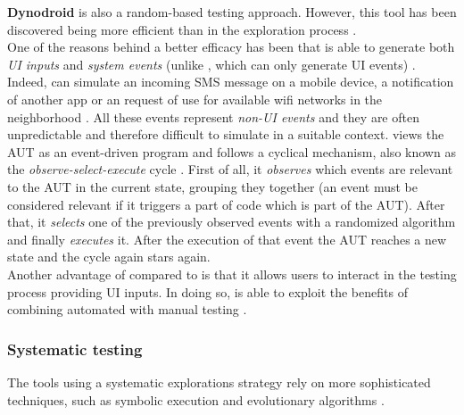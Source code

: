 \textbf{Dynodroid} \cite{dynodroid} is also a random-based testing approach. However, this tool has been discovered being more efficient than \monkey in the exploration process  \cite{areWeThereYet}. \\
One of the reasons behind a better efficacy has been that \dynodroid is able to generate both \textit{UI inputs} and \textit{system events} (unlike \monkey, which can only generate UI events) \cite{areWeThereYet}. \\  
Indeed, \dynodroid can simulate an incoming SMS message on a mobile device, a notification of another app or an request of use for available wifi networks in the neighborhood \cite{dynodroid}. All these events represent \textit{non-UI events} and they are often unpredictable and therefore difficult to simulate in a suitable context. 
\dynodroid views the AUT as an event-driven program and follows a cyclical mechanism, also known as the \textit{observe-select-execute} cycle \cite{dynodroid}. First of all, it \textit{observes} which events are relevant to the AUT in the current state, grouping they together (an event must be considered relevant if it triggers a part of code which is part of the AUT). After that, it \textit{selects} one of the previously observed events with a randomized algorithm \cite{dynodroid, areWeThereYet} and finally \textit{executes} it. After the execution of that event the AUT reaches a new state and the cycle again stars again. \\
Another advantage of \dynodroid compared to \monkey is that it allows users to interact in the testing process providing UI inputs. In doing so, \dynodroid is able to exploit the benefits of combining automated with manual testing \cite{dynodroid}.

\subsubsection{Systematic testing}
The tools using a systematic explorations strategy rely on more sophisticated techniques, such as symbolic execution and evolutionary algorithms \cite{areWeThereYet}. 


